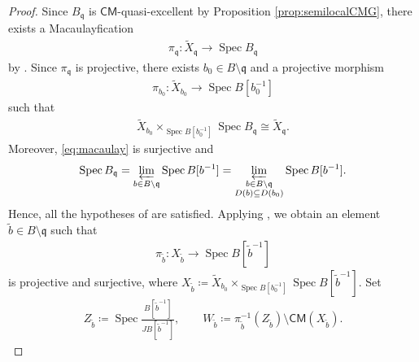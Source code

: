 \documentclass[a4paper, 11pt]{amsart}
\theoremstyle{definition}
\newcommand{\Spec}{\operatorname{Spec}}
\let\subset\subseteq
\renewcommand{\tilde}[1]{\widetilde{#1}}
\begin{document}
\begin{proof}
    Since $B_\mathfrak{q}$ is $\mathsf{CM}$-quasi-excellent by Proposition \ref{prop:semilocalCMG}, there exists a Macaulayfication 
    \begin{align}\label{eq:macaulay}
        \pi_\mathfrak{q} \colon \tilde{X}_\mathfrak{q} \to \Spec B_\mathfrak{q}
    \end{align}
    by \cite[Theorem 1.6]{Ces21}. Since $\pi_\mathfrak{q}$ is projective, there exists $b_0 \in B \setminus \mathfrak{q}$ and a projective morphism
    \begin{align*}
        \pi_{b_0} \colon \tilde{X}_{b_0} \to \Spec B[b_0^{-1}]
    \end{align*}
    such that 
    \begin{align*}
        \tilde{X}_{b_0} \times_{\Spec B[b_0^{-1}]} \Spec B_\mathfrak{q} \cong \tilde{X}_\mathfrak{q}.
    \end{align*}
    Moreover, \eqref{eq:macaulay} is surjective and 
    \begin{align*}
        \Spec B_\mathfrak{q} = \varprojlim_{b \in B \setminus \mathfrak{q}} \Spec B[b^{-1}] = \varprojlim_{\substack{b \in B \setminus \mathfrak{q} \\ D(b) \subset D(b_0)}} \Spec B[b^{-1}].
    \end{align*}
    Hence, all the hypotheses of \cite[\href{https://stacks.math.columbia.edu/tag/081D}{Tag 081D}]{stacks-project} are satisfied. Applying \cite[\href{https://stacks.math.columbia.edu/tag/07RR}{Tag 07RR}] {stacks-project}, we obtain an element $\tilde{b}\in B\setminus\mathfrak{q}$ such that
    \begin{align*}
        \pi_{\tilde{b}} \colon X_{\tilde{b}} \to \Spec B[\tilde{b}^{-1}]
    \end{align*}
    is projective and surjective, where $X_{\tilde{b}} \coloneqq \tilde{X}_{b_0} \times_{\Spec B[b_0^{-1}]} \Spec B[\tilde{b}^{-1}]$. Set 
    \begin{align*}
        Z_{\tilde{b}} \coloneqq \Spec \frac{B[\tilde{b}^{-1}]}{JB[\tilde{b}^{-1}]}, \qquad W_{\tilde{b}} \coloneqq \pi_{\tilde{b}}^{-1}(Z_{\tilde{b}}) \setminus \mathsf{CM}(X_{\tilde{b}}). 
    \end{align*}

\end{proof}
\end{document}
